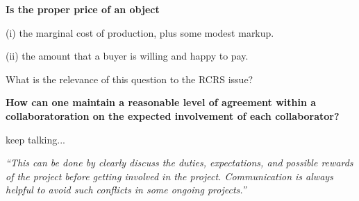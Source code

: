 \documentclass[portrait,11pt]{seminar}
\begin{document}
{
\bf Is the proper price of an object 

(i) the marginal cost of production, plus some modest markup.

(ii) the amount that a buyer is willing and happy to pay.

What is the relevance of this question to the RCRS issue?
}

\es
\bs

\es
\bs

\bf How can one maintain a reasonable level of agreement within a collaboratoration on the expected involvement of each collaborator?

\normalfont
keep talking...

{\it ``This can be done by clearly discuss the duties, expectations, and possible rewards of the project before getting involved in the project. Communication is always helpful to avoid such conflicts in some ongoing projects.''}
\es
\end{document}
